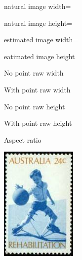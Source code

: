 \documentclass[justified]{tufte-book}
\begin{document}
natural image width= \z

natural image height=\y

estimated image width= 

eatimated image height

No point raw width \raw@image@width@nopoint

With point raw width \raw@image@width@pt

No point raw height \raw@image@height@nopoint

With point raw height \raw@image@height@pt

Aspect ratio \aspect@ratio
% 
\def\get@scale#1#2{%
 \FPdiv\stamp@scale{#1}{#2}
 \FPround\stamp@scale{\stamp@scale}{5}
\stamp@scale}
%
%
%


\z

\includegraphics[scale=1.44915]{./graphics/australia/SG516}
\end{document}
